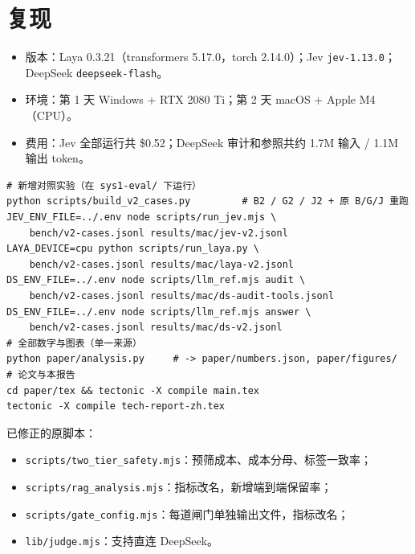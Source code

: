\documentclass[UTF8,fontset=none,zihao=-4]{ctexart}
\newcommand{\laya}{\textsf{Laya}}
\newcommand{\jev}{\textsf{Jev}}
\begin{document}
\section{复现}
\begin{itemize}
\item 版本：\laya{} 0.3.21（transformers 5.17.0，torch 2.14.0）；\jev{} \texttt{jev-1.13.0}；DeepSeek \texttt{deepseek-flash}。
\item 环境：第 1 天 Windows + RTX 2080 Ti；第 2 天 macOS + Apple M4（CPU）。
\item 费用：\jev{} 全部运行共 \$0.52；DeepSeek 审计和参照共约 1.7M 输入 / 1.1M 输出 token。
\end{itemize}
{\footnotesize
\begin{verbatim}
# 新增对照实验（在 sys1-eval/ 下运行）
python scripts/build_v2_cases.py         # B2 / G2 / J2 + 原 B/G/J 重跑
JEV_ENV_FILE=../.env node scripts/run_jev.mjs \
    bench/v2-cases.jsonl results/mac/jev-v2.jsonl
LAYA_DEVICE=cpu python scripts/run_laya.py \
    bench/v2-cases.jsonl results/mac/laya-v2.jsonl
DS_ENV_FILE=../.env node scripts/llm_ref.mjs audit \
    bench/v2-cases.jsonl results/mac/ds-audit-tools.jsonl
DS_ENV_FILE=../.env node scripts/llm_ref.mjs answer \
    bench/v2-cases.jsonl results/mac/ds-v2.jsonl
# 全部数字与图表（单一来源）
python paper/analysis.py     # -> paper/numbers.json, paper/figures/
# 论文与本报告
cd paper/tex && tectonic -X compile main.tex
tectonic -X compile tech-report-zh.tex
\end{verbatim}}
已修正的原脚本：
\begin{itemize}
\item \texttt{scripts/two\_tier\_safety.mjs}：预筛成本、成本分母、标签一致率；
\item \texttt{scripts/rag\_analysis.mjs}：指标改名，新增端到端保留率；
\item \texttt{scripts/gate\_config.mjs}：每道闸门单独输出文件，指标改名；
\item \texttt{lib/judge.mjs}：支持直连 DeepSeek。
\end{itemize}

\appendix
\end{document}
